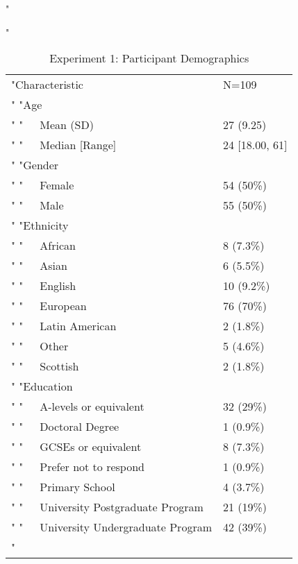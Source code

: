 \documentclass[
"  donotrepeattitle,doc, 12pt, a4paper,floatsintext]{apa7}"
\begin{document}
\begin{table}[h]
\begin{center}
\begin{threeparttable}
"\caption{\label{tab:unnamed-chunk-2}Experiment 1: Participant Demographics}"
\begin{tabular}{ll}
\toprule
"Characteristic & N=109\\"
\midrule
"Age & \\"
"\ \ \ Mean (SD) & 27 (9.25)\\"
"\ \ \ Median [Range] & 24 [18.00, 61]\\"
"Gender & \\"
"\ \ \ Female & 54 (50\%)\\"
"\ \ \ Male & 55 (50\%)\\"
"Ethnicity & \\"
"\ \ \ African & 8 (7.3\%)\\"
"\ \ \ Asian & 6 (5.5\%)\\"
"\ \ \ English & 10 (9.2\%)\\"
"\ \ \ European & 76 (70\%)\\"
"\ \ \ Latin American & 2 (1.8\%)\\"
"\ \ \ Other & 5 (4.6\%)\\"
"\ \ \ Scottish & 2 (1.8\%)\\"
"Education & \\"
"\ \ \ A-levels or equivalent & 32 (29\%)\\"
"\ \ \ Doctoral Degree & 1 (0.9\%)\\"
"\ \ \ GCSEs or equivalent & 8 (7.3\%)\\"
"\ \ \ Prefer not to respond & 1 (0.9\%)\\"
"\ \ \ Primary School & 4 (3.7\%)\\"
"\ \ \ University Postgraduate Program & 21 (19\%)\\"
"\ \ \ University Undergraduate Program & 42 (39\%)\\"
\bottomrule
\end{tabular}
\end{threeparttable}
\end{center}
\end{table}
\end{document}
